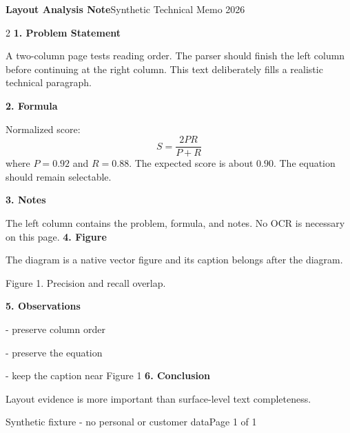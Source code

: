 \documentclass[10pt,a4paper]{article}
\begin{document}
{\fontsize{20}{24}\selectfont\bfseries Layout Analysis Note}\hfill{\small Synthetic Technical Memo 2026}\par
\vspace{2mm}{\color{blue}\rule{\textwidth}{1.8pt}}\par\vspace{4mm}
\begin{multicols}{2}
{\large\bfseries 1. Problem Statement}\par\vspace{2mm}
A two-column page tests reading order. The parser should finish the left column before continuing at the right column. This text deliberately fills a realistic technical paragraph.
\par\vspace{4mm}
{\large\bfseries 2. Formula}\par\vspace{2mm}
Normalized score:
\[
S = \frac{2PR}{P+R}
\]
where $P=0.92$ and $R=0.88$. The expected score is about $0.90$. The equation should remain selectable.
\par\vspace{4mm}
{\large\bfseries 3. Notes}\par\vspace{2mm}
The left column contains the problem, formula, and notes. No OCR is necessary on this page.
\columnbreak
{\large\bfseries 4. Figure}\par\vspace{2mm}
The diagram is a native vector figure and its caption belongs after the diagram.
\begin{center}
\end{center}
\begin{center}\small Figure 1. Precision and recall overlap.\end{center}
\vspace{4mm}
{\large\bfseries 5. Observations}\par\vspace{2mm}
- preserve column order\par
- preserve the equation\par
- keep the caption near Figure 1
\vspace{4mm}
{\large\bfseries 6. Conclusion}\par\vspace{2mm}
Layout evidence is more important than surface-level text completeness.
\end{multicols}
\vfill\scriptsize Synthetic fixture - no personal or customer data\hfill Page 1 of 1
\end{document}
